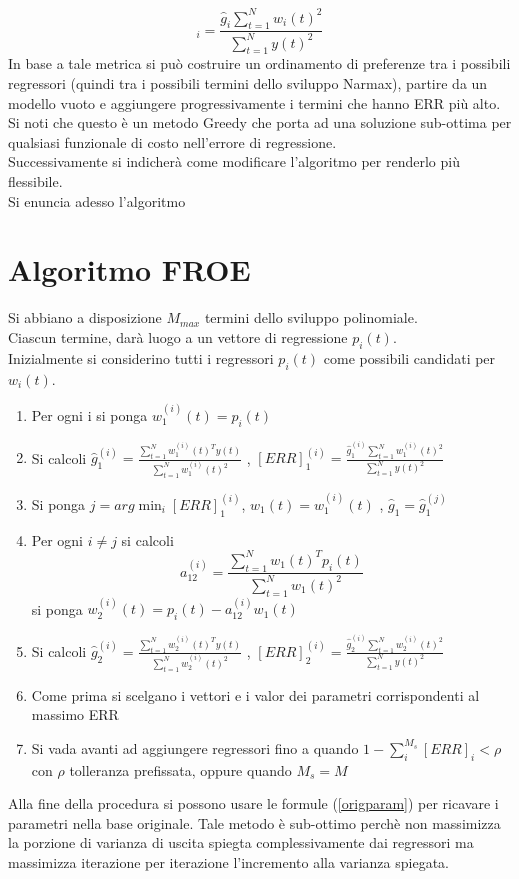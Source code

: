 \documentclass[10pt,a4paper]{book}
\begin{document}
\begin{equation}
[ERR]_i=\frac{\hat{g}_i\sum_{t=1}^N w_i(t)^2}{\sum_{t=1}^N y(t)^2}
\end{equation}
In base a tale metrica si può costruire un ordinamento di preferenze tra i possibili regressori (quindi tra i possibili termini dello sviluppo Narmax), partire da un modello vuoto e aggiungere progressivamente i termini che hanno ERR più alto.\\
Si noti che questo è un metodo Greedy che porta ad una soluzione sub-ottima per qualsiasi funzionale di costo nell'errore di regressione.\\
Successivamente si indicherà come modificare l'algoritmo per renderlo più flessibile.\\
Si enuncia adesso l'algoritmo
\section{Algoritmo FROE}
Si abbiano a disposizione $M_{max}$ termini dello sviluppo polinomiale.\\
Ciascun termine, darà luogo a un vettore di regressione $p_i(t)$.\\
Inizialmente si considerino tutti i regressori $p_i(t)$  come possibili candidati per $w_i(t)$.\\
\begin{enumerate}
\item Per ogni i si ponga $w_1^{(i)}(t)=p_i(t) $\\
\item Si calcoli $\hat{g}_1^{(i)}=\frac{\sum_{t=1}^N{w_1^{(i)}(t)^Ty(t)}}{\sum_{t=1}^Nw_1^{(i)}(t)^2}$ , $[ERR]_1^{(i)}=\frac{\hat{g}_1^{(i)}\sum_{t=1}^N w_1^{(i)}(t)^2}{\sum_{t=1}^N y(t)^2}$
\item Si ponga $j=arg \min_i [ERR]_1^{(i)}$, $w_1(t)=w_1^{(i)}(t) $ , $\hat{g}_1=\hat{g}_1^{(j)}$
\item Per ogni $i\neq j$ si calcoli \[a_{12}^{(i)}=\frac{\sum_{t=1}^N{w_1(t)^Tp_i(t)}}{\sum_{t=1}^Nw_1(t)^2}\]
si ponga $w_2^{(i)}(t)=p_i(t)-a_{12}^{(i)}w_1(t) $
\item Si calcoli $\hat{g}_2^{(i)}=\frac{\sum_{t=1}^N{w_2^{(i)}(t)^Ty(t)}}{\sum_{t=1}^Nw_2^{(i)}(t)^2}$ , $[ERR]_2^{(i)}=\frac{\hat{g}_2^{(i)}\sum_{t=1}^N w_2^{(i)}(t)^2}{\sum_{t=1}^N y(t)^2}$
\item Come prima si scelgano i vettori e i valor dei parametri corrispondenti al massimo ERR
\item Si vada avanti ad aggiungere regressori fino a quando $1-\sum_i^{M_s} [ERR]_i < \rho$ con $\rho$ tolleranza prefissata, oppure quando $M_s=M$
\end{enumerate}
Alla fine della procedura si possono usare le formule (\ref{origparam}) per ricavare i parametri nella base originale.
Tale metodo è sub-ottimo perchè non massimizza la porzione di varianza di uscita spiegta complessivamente dai regressori ma massimizza iterazione per iterazione l'incremento alla varianza spiegata.
\end{document}
